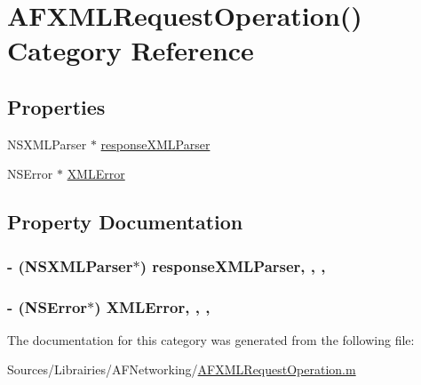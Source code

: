 \hypertarget{category_a_f_x_m_l_request_operation_07_08}{\section{A\-F\-X\-M\-L\-Request\-Operation() Category Reference}
\label{category_a_f_x_m_l_request_operation_07_08}
}
\subsection*{Properties}
\begin{DoxyCompactItemize}
\item 
N\-S\-X\-M\-L\-Parser $\ast$ \hyperlink{category_a_f_x_m_l_request_operation_07_08_ab74b1a873fc6d5b3c4f6437a6783d9f6}{response\-X\-M\-L\-Parser}
\item 
N\-S\-Error $\ast$ \hyperlink{category_a_f_x_m_l_request_operation_07_08_a9772e537e23c5a40af9b9651cbe76449}{X\-M\-L\-Error}
\end{DoxyCompactItemize}


\subsection{Property Documentation}
\hypertarget{category_a_f_x_m_l_request_operation_07_08_ab74b1a873fc6d5b3c4f6437a6783d9f6}{
\subsubsection[{response\-X\-M\-L\-Parser}]{\setlength{\rightskip}{0pt plus 5cm}-\/ (N\-S\-X\-M\-L\-Parser$\ast$) response\-X\-M\-L\-Parser\hspace{0.3cm}{\ttfamily [read]}, {\ttfamily [write]}, {\ttfamily [nonatomic]}, {\ttfamily [strong]}}}\label{category_a_f_x_m_l_request_operation_07_08_ab74b1a873fc6d5b3c4f6437a6783d9f6}
\hypertarget{category_a_f_x_m_l_request_operation_07_08_a9772e537e23c5a40af9b9651cbe76449}{
\subsubsection[{X\-M\-L\-Error}]{\setlength{\rightskip}{0pt plus 5cm}-\/ (N\-S\-Error$\ast$) X\-M\-L\-Error\hspace{0.3cm}{\ttfamily [read]}, {\ttfamily [write]}, {\ttfamily [nonatomic]}, {\ttfamily [strong]}}}\label{category_a_f_x_m_l_request_operation_07_08_a9772e537e23c5a40af9b9651cbe76449}


The documentation for this category was generated from the following file\-:\begin{DoxyCompactItemize}
\item 
Sources/\-Librairies/\-A\-F\-Networking/\hyperlink{_a_f_x_m_l_request_operation_8m}{A\-F\-X\-M\-L\-Request\-Operation.\-m}\end{DoxyCompactItemize}
